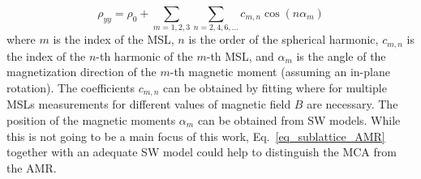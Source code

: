 \documentclass[prb,showpacs,amsmath,amssymb,superscriptaddress,twocolumn,floatfix]{revtex4-1}
\begin{document}
\begin{appendix}
\begin{equation}
	\rho_{yy} = \rho_0 + \sum_{m = 1,2,3} \sum_{n = 2, 4, 6, ...} c_{m,n} \cos(n \alpha_m)
	\label{eq_sublattice_AMR}
\end{equation}
where $m$ is the index of the MSL, $n$ is the order of the spherical harmonic, $c_{m,n}$ is the index of the $n$-th harmonic of the $m$-th MSL, and $\alpha_m$ is the angle of the magnetization direction of the $m$-th magnetic moment (assuming an in-plane rotation). The coefficients $c_{m,n}$ can be obtained by fitting where for multiple MSLs measurements for different values of magnetic field $B$ are necessary. The position of the magnetic moments $\alpha_m$ can be obtained from SW models. While this is not going to be a main focus of this work, Eq.~\ref{eq_sublattice_AMR} together with an adequate SW model could help to distinguish the MCA from the AMR.


\end{appendix}

\def\urlprefix{}
\def\url#1{}
\end{document}
